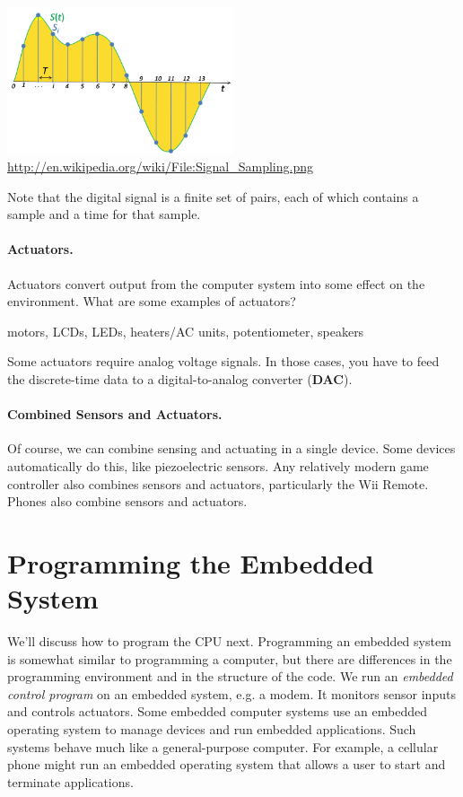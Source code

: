 \begin{center}
\includegraphics[width=0.5\textwidth]{images/sampling.png}
\hfill \url{http://en.wikipedia.org/wiki/File:Signal_Sampling.png}
\end{center}

Note that the digital signal is a finite set of pairs, each of which
contains a sample and a time for that sample.

\paragraph{Actuators.} Actuators convert output from the computer
system into some effect on the environment.  What are some
  examples of actuators?

motors, LCDs, LEDs, heaters/AC units, potentiometer, speakers

Some actuators require analog voltage signals. In those cases, you
have to feed the discrete-time data to a digital-to-analog converter
({\bf DAC}).

\paragraph{Combined Sensors and Actuators.} Of course, we can combine
sensing and actuating in a single device. Some devices automatically
do this, like piezoelectric sensors. Any relatively modern game
controller also combines sensors and actuators, particularly the Wii
Remote. Phones also combine sensors and actuators.


\section*{Programming the Embedded System}
We'll discuss how to program the CPU next. Programming an embedded
system is somewhat similar to programming a computer, but there are
differences in the programming environment and in the structure of the
code.
We run an \emph{embedded control program} on an embedded system, e.g. a modem. It monitors
sensor inputs and controls actuators. Some embedded computer systems use an embedded operating system to manage devices and run embedded applications.  Such systems behave much like a general-purpose computer.  For example, a cellular phone might run an embedded operating system that allows a user to start and terminate applications.

